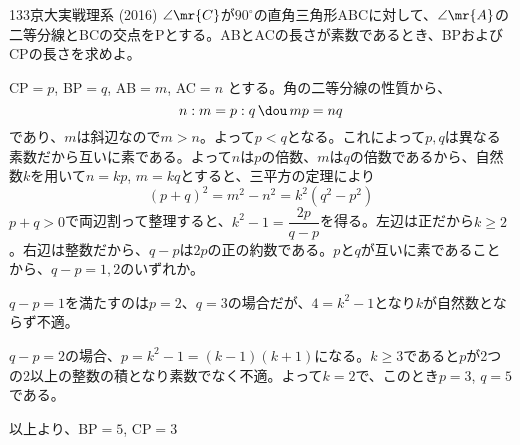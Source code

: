 \begin{thm}{133}{\maru}{京大実戦理系 (2016)}
 $\angle\mr{C}$が$90^\circ$の直角三角形ABCに対して、$\angle\mr{A}$の二等分線とBCの交点をPとする。ABとACの長さが素数であるとき、BPおよびCPの長さを求めよ。
\end{thm}

CP$=p$, BP$=q$, AB$=m$, AC$=n$ とする。角の二等分線の性質から、
\[ n:m=p:q \,\dou\, mp=nq \]
であり、$m$は斜辺なので$m>n$。よって$p<q$となる。これによって$p, q$は異なる素数だから互いに素である。よって$n$は$p$の倍数、$m$は$q$の倍数であるから、自然数$k$を用いて$n=kp$, $m=kq$とすると、三平方の定理により
\[ (p+q)^2=m^2-n^2=k^2(q^2-p^2) \]
$p+q>0$で両辺割って整理すると、$k^2-1=\dfrac{2p}{q-p}$を得る。左辺は正だから$k\ge 2$。右辺は整数だから、$q-p$は$2p$の正の約数である。$p$と$q$が互いに素であることから、$q-p=1, 2$のいずれか。

$q-p=1$を満たすのは$p=2$、$q=3$の場合だが、$4=k^2-1$となり$k$が自然数とならず不適。

$q-p=2$の場合、$p=k^2-1=(k-1)(k+1)$になる。$k\ge 3$であると$p$が2つの2以上の整数の積となり素数でなく不適。よって$k=2$で、このとき$p=3$, $q=5$である。

以上より、BP$=5$, CP$=3$
